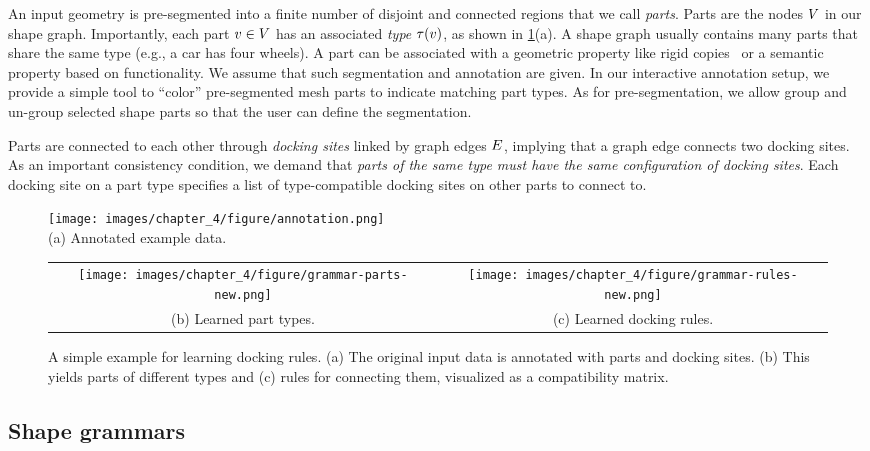  An input geometry is pre-segmented into a finite number of disjoint and connected regions that we call \emph{parts}. Parts are the nodes $V$ in our shape graph. Importantly, each part $v \in V$ has an associated \emph{type} $\tau(v)$, as shown in \ref{fig:annotation}(a).
A shape graph usually contains many parts that share the same type (e.g., a car has four wheels).
A part can be associated with a geometric property like rigid copies~\cite{Bokeloh2010} or a semantic property based on functionality.
We assume that such segmentation and annotation are given. In our interactive annotation setup, we provide a simple tool to ``color'' pre-segmented mesh parts to indicate matching part types. As for pre-segmentation, we allow group and un-group selected shape parts so that the user can define the segmentation.

 Parts are connected to each other through \emph{docking sites} linked by graph edges $E$, implying that a graph edge connects two docking sites. As an important consistency condition, we demand that \emph{parts of the same type must have the same configuration of docking sites}. Each docking site on a part type specifies a list of type-compatible docking sites on other parts to connect to.

\begin{figure}
	\centering
		\texttt{[image: images/chapter\_4/figure/annotation.png]}\\
		\small (a) Annotated example data. \\
		\begin{tabular}{cc}
		\texttt{[image: images/chapter\_4/figure/grammar-parts-new.png]} &
		\texttt{[image: images/chapter\_4/figure/grammar-rules-new.png]} \\		
		\small (b) Learned part types. &
		\small (c) Learned docking rules.\\
		\end{tabular}
	\caption[A simple example for learning docking rules. ]{A simple example for learning docking rules. (a) The original input data is annotated with parts and docking sites. (b) This yields parts of different types and (c) rules for connecting them, visualized as a compatibility matrix.}
	\label{fig:annotation}
\end{figure}

\subsection{Shape grammars}

